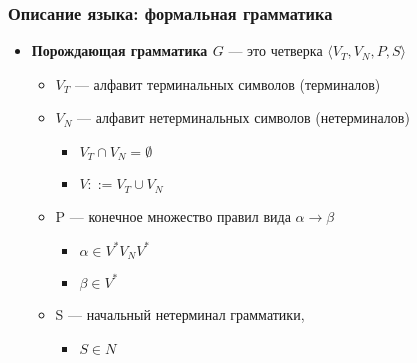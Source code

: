 \documentclass{beamer}
\begin{document}
\begin{frame}[fragile]
  \transwipe[direction=90]
  \frametitle{Описание языка: формальная грамматика}
  \begin{itemize}
    \item \textbf{Порождающая грамматика $G$} --- это четверка $\langle V_T, V_N, P, S \rangle$

    \begin{itemize}
      \item $V_T$ --- алфавит терминальных  символов (терминалов)
      \item $V_N$ --- алфавит нетерминальных  символов (нетерминалов)
      \begin{itemize}
        \item $V_T \cap V_N = \emptyset$
        \item $V ::= V_T \cup V_N$
      \end{itemize}
      \item P --- конечное множество правил вида $\alpha \rightarrow \beta$
      \begin{itemize}
        \item $\alpha \in V^* V_N V^*$
        \item $\beta \in V^*$
      \end{itemize}
      \item S --- начальный нетерминал грамматики,\begin{itemize}
        \item $S  \in N$
      \end{itemize}
    \end{itemize}
  \end{itemize}
\end{frame}
\end{document}
